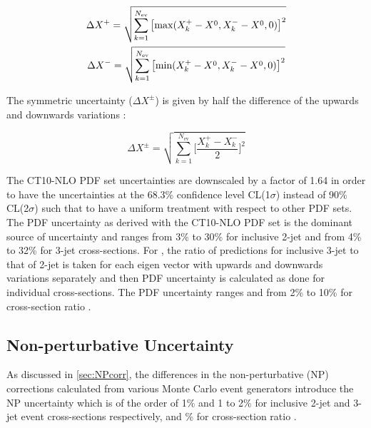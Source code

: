 \begin{equation}
\label{eq:unc_pdf}
\begin{gathered}
\Delta X^+ = \sqrt{\sum \limits_{k=1}^{N_\mathrm{ev}}\big[{\rm max}(X^{+}_{k}-X^{0},X^{-}_{k}-X^{0},0)\big]^2} \\
\Delta X^- = \sqrt{\sum \limits_{k=1}^{N_\mathrm{ev}}\big[{\rm min}(X^{+}_{k}-X^{0},X^{-}_{k}-X^{0},0)\big]^2}
\end{gathered}
\end{equation}

The symmetric uncertainty ($\Delta X^{\pm}$) is given by half the difference of the upwards and downwards variations :

\begin{equation}
\label{eq:unc_pdf_symm}
\Delta X^{\pm} = \sqrt{\sum \limits_{k=1}^{N_\mathrm{ev}} \Bigg[\frac{X^{+}_{k}-X^{-}_{k}}{2}\Bigg]^2}
\end{equation}

The CT10-NLO PDF set uncertainties are downscaled by a factor of 1.64 in order to have the uncertainties at the 68.3\% confidence level CL(1$\sigma$) instead of 90\% CL(2$\sigma$) such that to have a uniform treatment with respect to other PDF sets. The PDF uncertainty as derived with the CT10-NLO PDF set is the dominant source of uncertainty and ranges from 3\% to 30\% for inclusive 2-jet and from 4\% to 32\% for 3-jet cross-sections. For \ratio, the ratio of predictions for inclusive 3-jet to that of 2-jet is taken for each eigen vector with upwards and downwards variations separately and then PDF uncertainty is calculated as done for individual cross-sections. The PDF uncertainty ranges and from 2\% to 10\% for cross-section ratio \ratio. 

\subsection{Non-perturbative Uncertainty}
As discussed in \ref{sec:NPcorr}, the differences in the non-perturbative (NP) corrections calculated from various Monte Carlo event generators introduce the NP uncertainty which is of the order of 1\% and 1 to 2\% for inclusive 2-jet and 3-jet event cross-sections respectively, and \% for cross-section ratio \ratio.


